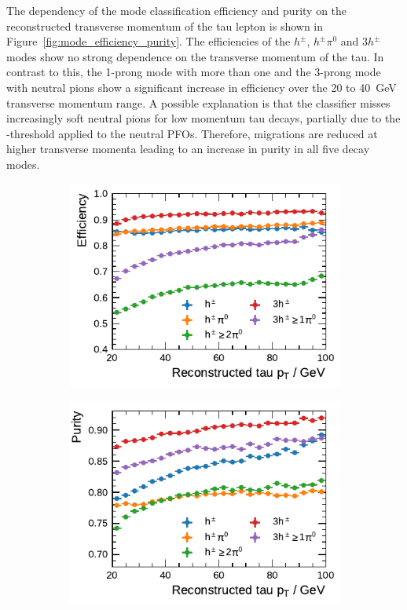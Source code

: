 The dependency of the mode classification efficiency and purity on the
reconstructed transverse momentum of the tau lepton is shown in
Figure~\ref{fig:mode_efficiency_purity}. The efficiencies of the $h^\pm$,
$h^\pm \pi^0$ and $3h^\pm$ modes show no strong dependence on the transverse
momentum of the tau. In contrast to this, the 1-prong mode with more than one
and the 3-prong mode with neutral pions show a significant increase in
efficiency over the \num{20} to \SI{40}{\GeV} transverse momentum range. A
possible explanation is that the classifier misses increasingly soft neutral
pions for low momentum tau decays, partially due to the \pt-threshold applied to
the neutral PFOs. Therefore, migrations are reduced at higher transverse momenta
leading to an increase in purity in all five decay modes.

\begin{figure}[htb]
  \begin{subfigure}{0.48\textwidth}
    \centering
    \includegraphics{./figures/decay_mode_classification/combined_sub_e_moments_shots_conv_ptcut_1_5/efficiency_profile.pdf}
    \vspace*{-1.6em}
    \subcaption{}
  \end{subfigure}\hfill
  \begin{subfigure}{0.48\textwidth}
    \centering
    \includegraphics{./figures/decay_mode_classification/combined_sub_e_moments_shots_conv_ptcut_1_5/purity_profile.pdf}

\end{subfigure}
\end{figure}

